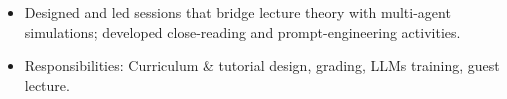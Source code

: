\begin{itemize}
  \item Designed and led sessions that bridge lecture theory with multi-agent simulations; developed close-reading and prompt-engineering activities.
\end{itemize}

\begin{itemize}
   \item Responsibilities: Curriculum & tutorial design, grading, LLMs training, guest lecture.
\end{itemize}


